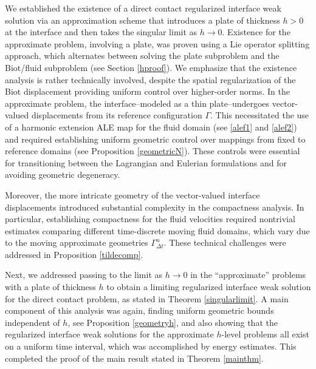 \documentclass[11pt]{article}
\theoremstyle{definition}
\begin{document}
We established the existence of a direct contact regularized interface weak solution via an approximation scheme that introduces a plate of thickness $h > 0$ at the interface and then takes the singular limit as $h \to 0$. Existence for the approximate problem, involving  a plate,  was proven using a Lie operator splitting approach, which alternates between solving the plate subproblem and the Biot/fluid subproblem (see Section \ref{hproof}).
%
We emphasize that the existence analysis is rather technically involved, despite the spatial regularization of the Biot displacement providing uniform control over higher-order norms. In the approximate problem, the interface--modeled as a thin plate--undergoes vector-valued displacements from its reference configuration $\Gamma$. This necessitated the use of a harmonic extension ALE map for the fluid domain (see \eqref{alef1} and \eqref{alef2}) and required establishing uniform geometric control over mappings from fixed to reference domains (see Proposition \ref{geometricN}). 
These controls were essential for transitioning between the Lagrangian and Eulerian formulations and for avoiding geometric degeneracy.

Moreover, the more intricate geometry of the vector-valued interface displacements introduced substantial complexity in the compactness analysis. In particular, establishing compactness for the fluid velocities required nontrivial estimates comparing different time-discrete moving fluid domains, which vary due to the moving approximate geometries $\Gamma^{n}_{\Delta t}$. These technical challenges were addressed in Proposition \ref{tildecomp}.

Next, we addressed passing to the limit as $h \to 0$ in the ``approximate'' problems with a plate of thickness $h$  to obtain a limiting regularized interface weak solution for the direct contact problem, as stated in Theorem \ref{singularlimit}. 
A main component of this analysis was again, finding uniform geometric bounds independent of $h$, see Proposition \ref{geometryh}, and also showing that the regularized interface weak solutions for the approximate $h$-level problems all exist on a uniform time interval, which was accomplished by energy estimates. 
This completed the proof of the main result stated in Theorem \ref{mainthm}.
\end{document}
